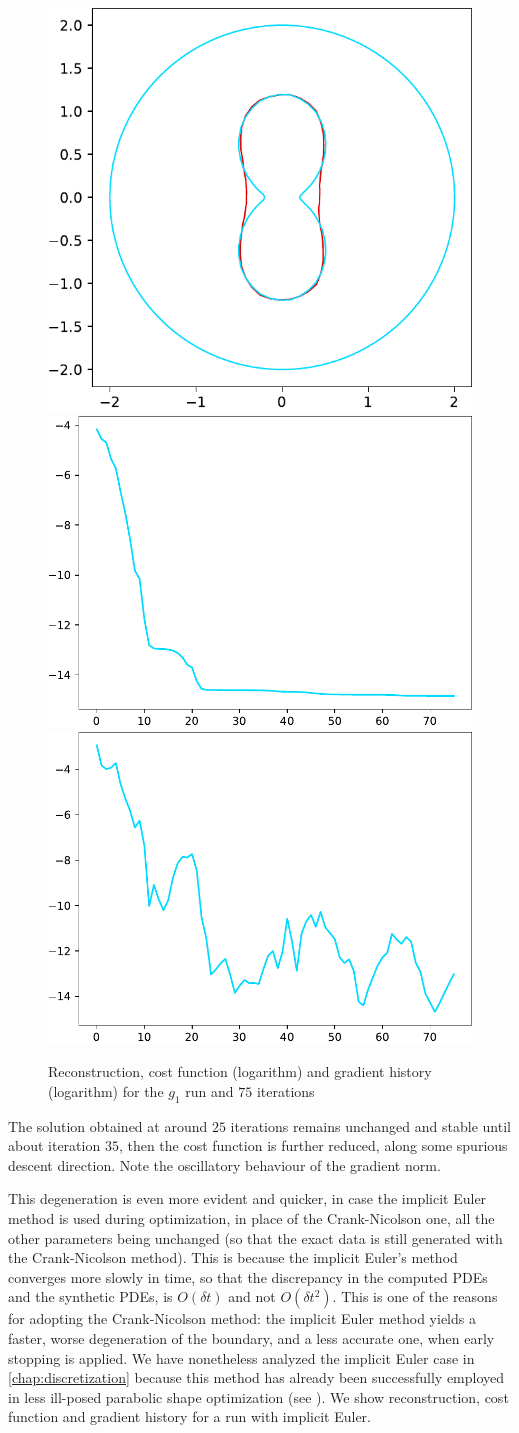 \documentclass[english,a4paper,9pt,oneside]{scrbook}	%
\theoremstyle{break}
\theoremstyle{remark}
\begin{document}
\begin{figure}[H]
\centering
\includegraphics[height=0.25\columnwidth]{Images/hourglass_constant_degenerate/comparison.pdf}
\includegraphics[height=0.25\columnwidth]{Images/hourglass_constant_degenerate/cost_function.pdf}
\includegraphics[height=0.25\columnwidth]{Images/hourglass_constant_degenerate/gradient_infty_norm.pdf}
\caption{Reconstruction, cost function (logarithm) and gradient history (logarithm) for the $g_1$ run and $75$ iterations}\label{fig:degenerate}
\end{figure}

The solution obtained at around $25$ iterations remains unchanged and stable until about iteration $35$, then the cost function is further reduced, along some spurious descent direction. Note the oscillatory behaviour of the gradient norm.

This degeneration is even more evident and quicker, in case the implicit Euler method is used during optimization, in place of the Crank-Nicolson one, all the other parameters being unchanged (so that the exact data is still generated with the Crank-Nicolson method). This is because the implicit Euler's method converges more slowly in time, so that the discrepancy in the computed PDEs and the synthetic PDEs, is $O(\delta t)$ and not $O(\delta t^2)$. This is one of the reasons for adopting the Crank-Nicolson method: the implicit Euler method yields a faster, worse degeneration of the boundary, and a less accurate one, when early stopping is applied. We have nonetheless analyzed the implicit Euler case in \cref{chap:discretization} because this method has already been successfully employed in less ill-posed parabolic shape optimization (see \cite{lindemann2}). We show reconstruction, cost function and gradient history for a run with implicit Euler.
\end{document}

